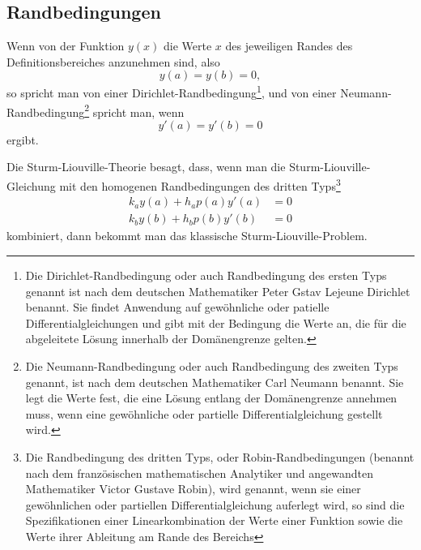 \subsection{Randbedingungen\label{sub:was-ist-das-slp-randbedingungen}}
Wenn von der Funktion $y(x)$ die Werte $x$ des jeweiligen Randes des Definitionsbereiches anzunehmen sind, also
\begin{equation}
	y(a) = y(b) = 0,
\end{equation}
so spricht man von einer Dirichlet-Randbedingung\footnote{Die Dirichlet-Randbedingung oder auch Randbedingung des ersten Typs genannt ist nach dem deutschen Mathematiker Peter Gstav Lejeune Dirichlet benannt. Sie findet Anwendung auf gewöhnliche oder patielle Differentialgleichungen und gibt mit der Bedingung die Werte an, die für die abgeleitete Lösung innerhalb der Domänengrenze gelten.}, und von einer Neumann-Randbedingung\footnote{Die Neumann-Randbedingung oder auch Randbedingung des zweiten Typs genannt, ist nach dem deutschen Mathematiker Carl Neumann benannt. Sie legt die Werte fest, die eine Lösung entlang der Domänengrenze annehmen muss, wenn eine gewöhnliche oder partielle Differentialgleichung gestellt wird.} spricht man, wenn
\begin{equation}
	y'(a) = y'(b) = 0
\end{equation}
ergibt.

Die Sturm-Liouville-Theorie besagt, dass, wenn man die Sturm-Liouville-Gleichung mit den homogenen Randbedingungen des dritten Typs\footnote{Die Randbedingung des dritten Typs, oder Robin-Randbedingungen (benannt nach dem französischen mathematischen Analytiker und angewandten Mathematiker Victor Gustave Robin), wird genannt, wenn sie einer gewöhnlichen oder partiellen Differentialgleichung auferlegt wird, so sind die Spezifikationen einer Linearkombination der Werte einer Funktion sowie die Werte ihrer Ableitung am Rande des Bereichs}
\begin{equation}
\begin{aligned}
	\label{eq:randbedingungen}
	k_a y(a) + h_a p(a) y'(a) &= 0 \\
	k_b y(b) + h_b p(b) y'(b) &= 0
\end{aligned}
\end{equation}
kombiniert, dann bekommt man das klassische Sturm-Liouville-Problem.

